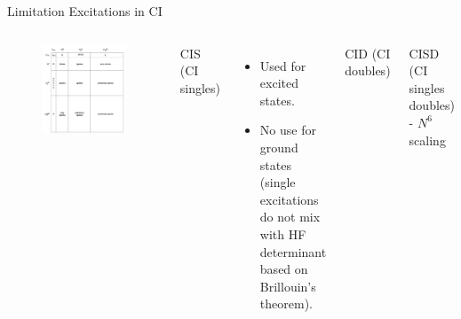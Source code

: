 \documentclass[aspectratio=169]{beamer}
\begin{document}
    \begin{frame}{Limitation Excitations in CI}
        \begin{columns}
            \begin{figure}
                \centering
                \includegraphics[width=0.8\linewidth]{lectures/figures/3_CI_excitations.png}
            \end{figure}
            CIS (CI singles)
            \begin{itemize}
                \item Used for excited states.
                \item No use for ground states (single excitations do not mix with HF determinant based on Brillouin's theorem).
            \end{itemize}

            CID (CI doubles)

            CISD (CI singles doubles) - $N^6$ scaling

        \end{columns}

    \end{frame}
\end{document}

